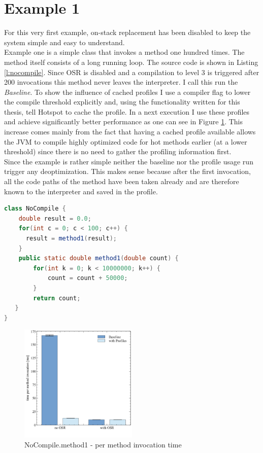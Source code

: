 \section{Example 1}
\label{s:ex1}
For this very first example, on-stack replacement has been disabled to keep the system simple and easy to understand.
\\
Example one is a simple class that invokes a method one hundred times. The method itself consists of a long running loop. The source code is shown in Listing \ref{l:nocompile}.
Since OSR is disabled and a compilation to level 3 is triggered after 200 invocations this method never leaves the interpreter. I call this run the \textit{Baseline}.
To show the influence of cached profiles I use a compiler flag to lower the compile threshold explicitly and, using the functionality written for this thesis, tell Hotspot to cache the profile.
In a next execution I use these profiles and achieve significantly better performance as one can see in Figure \ref{f:nocompile}.
This increase comes mainly from the fact that having a cached profile available allows the JVM to compile highly optimized code for hot methods earlier (at a lower threshold) since there is no need to gather the profiling information first.
\\
Since the example is rather simple neither the baseline nor the profile usage run trigger any deoptimization. This makes sense because after the first invocation, all the code paths of the method have been taken already and are therefore known to the interpreter and saved in the profile.
\begin{lstlisting}[float,caption=Simple method that does not get compiled,label=l:nocompile,language=Java]
class NoCompile {
    double result = 0.0;
    for(int c = 0; c < 100; c++) {
      result = method1(result);
    }
    public static double method1(double count) {
        for(int k = 0; k < 10000000; k++) {
            count = count + 50000;
        }
        return count;
   }
}
\end{lstlisting}
\begin{figure}[ht]
  \begin{center}
    \centering
    \includegraphics[width=0.5\textwidth]{figures/nocompile.png}
    \caption{NoCompile.method1 - per method invocation time}
    \label{f:nocompile}
  \end{center}
\end{figure}

